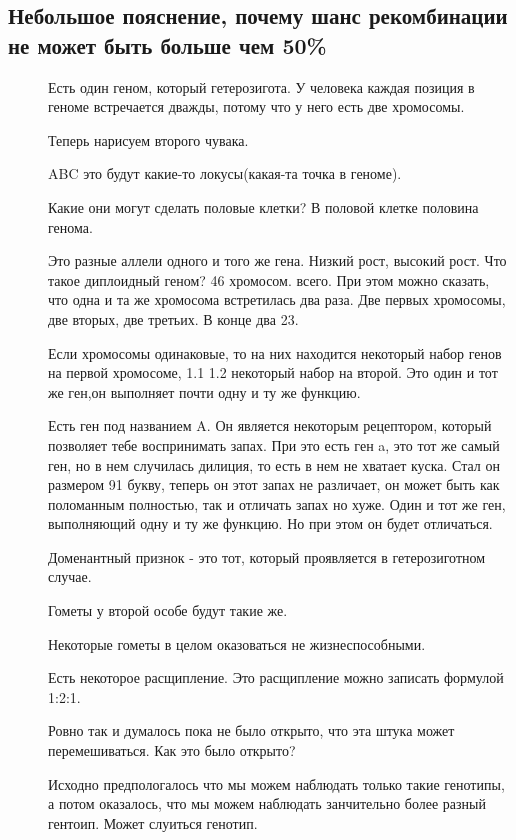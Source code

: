 \subsection{Небольшое пояснение, почему шанс рекомбинации не может быть больше чем 50\%}

\begin{description}
\item[]
Есть один геном, который гетерозигота. У человека каждая 
позиция в геноме встречается дважды, потому что 
у него есть две хромосомы. 

Теперь нарисуем второго чувака. 

ABC это будут какие-то локусы(какая-та точка в геноме). 

Какие они могут сделать половые клетки? 
В половой клетке половина генома. 

Это разные аллели одного и того же гена. Низкий рост, высокий рост. 
Что такое диплоидный геном? 46 хромосом. всего. При этом 
можно сказать, что одна и та же хромосома встретилась два раза. 
Две первых хромосомы, две вторых, две третьих. В конце два 23. 

Если хромосомы одинаковые, то на них находится некоторый набор генов на первой 
хромосоме, 
1.1
1.2 
некоторый набор на второй. Это один и тот же ген,он выполняет почти одну и ту же функцию. 

Есть ген под названием A. Он является некоторым рецептором, который 
позволяет тебе воспринимать запах. При это есть 
ген a, это тот же самый ген, но в нем случилась дилиция, то есть 
в нем не хватает куска. Стал он размером 91 букву, теперь 
он этот запах не различает, он может быть как 
поломанным полностью, так и отличать 
запах но хуже. Один и тот же ген, выполняющий одну и ту же 
функцию. Но при этом он будет отличаться. 

Доменантный признок - это тот, который 
проявляется в гетерозиготном случае. 

Гометы у второй особе будут такие же. 

Некоторые гометы в целом оказоваться не жизнеспособными. 

\TODO %

Есть некоторое 
расщипление. Это расщипление можно записать формулой 1:2:1.

Ровно так и думалось пока не было открыто, что 
эта штука может перемешиваться. Как 
это было открыто? 

Исходно предпологалось что мы можем наблюдать только такие генотипы, а
потом оказалось, что мы можем наблюдать занчительно 
более разный гентоип. Может слуиться генотип. 


\end{description}
